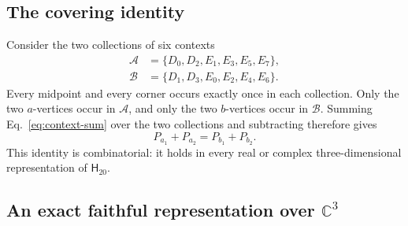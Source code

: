 \documentclass[twocolumn,aps,pra,floatfix,amsmath,amssymb,longbibliography]{revtex4-2}
\theoremstyle{definition}
\theoremstyle{remark}
\newcommand{\C}{\mathbb C}
\newcommand{\Htwenty}{\mathsf H_{20}}
\begin{document}
\subsection{The covering identity}

Consider the two collections of six contexts
\begin{align*}
 \mathcal A&=\{D_0,D_2,E_1,E_3,E_5,E_7\},\\
 \mathcal B&=\{D_1,D_3,E_0,E_2,E_4,E_6\}.
\end{align*}
Every midpoint and every corner occurs exactly once in each collection.
Only the two $a$-vertices occur in $\mathcal A$, and only the two
$b$-vertices occur in $\mathcal B$.  Summing Eq.~\eqref{eq:context-sum}
over the two collections and subtracting therefore gives
\begin{equation}
 P_{a_1}+P_{a_2}=P_{b_1}+P_{b_2}.
 \label{eq:covering-identity}
\end{equation}
This identity is combinatorial: it holds in every real or complex
three-dimensional representation of $\Htwenty$.

\subsection{An exact faithful representation over
\texorpdfstring{$\C^3$}{C3}}
\end{document}
